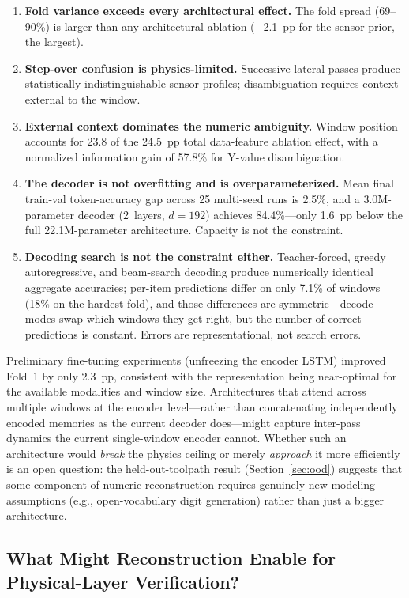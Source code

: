 \documentclass[sensors,article,submit,moreauthors,pdftex]{Definitions/mdpi}
\begin{document}
\begin{enumerate}[leftmargin=*]
    \item \textbf{Fold variance exceeds every architectural effect.} The fold spread (69--90\%) is larger than any architectural ablation ($-$2.1~pp for the sensor prior, the largest).
    \item \textbf{Step-over confusion is physics-limited.} Successive lateral passes produce statistically indistinguishable sensor profiles; disambiguation requires context external to the window.
    \item \textbf{External context dominates the numeric ambiguity.} Window position accounts for 23.8 of the 24.5~pp total data-feature ablation effect, with a normalized information gain of 57.8\% for Y-value disambiguation.
    \item \textbf{The decoder is not overfitting and is overparameterized.} Mean final train-val token-accuracy gap across 25 multi-seed runs is 2.5\%, and a 3.0M-parameter decoder (2~layers, $d{=}192$) achieves 84.4\%---only 1.6~pp below the full 22.1M-parameter architecture. Capacity is not the constraint.
    \item \textbf{Decoding search is not the constraint either.} Teacher-forced, greedy autoregressive, and beam-search decoding produce numerically identical aggregate accuracies; per-item predictions differ on only 7.1\% of windows (18\% on the hardest fold), and those differences are symmetric---decode modes swap which windows they get right, but the number of correct predictions is constant. Errors are representational, not search errors.
\end{enumerate}

Preliminary fine-tuning experiments (unfreezing the encoder LSTM) improved Fold~1 by only 2.3~pp, consistent with the representation being near-optimal for the available modalities and window size. Architectures that attend across multiple windows at the encoder level---rather than concatenating independently encoded memories as the current decoder does---might capture inter-pass dynamics the current single-window encoder cannot. Whether such an architecture would \emph{break} the physics ceiling or merely \emph{approach} it more efficiently is an open question: the held-out-toolpath result (Section~\ref{sec:ood}) suggests that some component of numeric reconstruction requires genuinely new modeling assumptions (e.g., open-vocabulary digit generation) rather than just a bigger architecture.

\subsection{What Might Reconstruction Enable for Physical-Layer Verification?}
\end{document}
